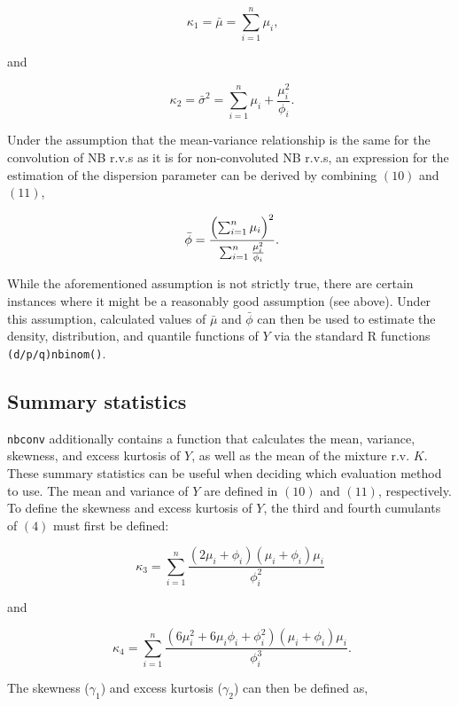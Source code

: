 \documentclass{article}
\begin{document}
\begin{equation}
	\phantom{ , } \kappa_1 =  \bar{ \mu } = \sum_{ i=1 }^n \mu_i ,
\end{equation}

and

\begin{equation}
	\phantom{ . } \kappa_2 = \bar{ \sigma }^2  = \sum_{ i=1 }^n \mu_i + \frac{ \mu_i^2 }{ \phi_i } .
\end{equation}

Under the assumption that the mean-variance relationship is the same for the convolution of NB r.v.s as it is for non-convoluted NB r.v.s, an expression for the estimation of the dispersion parameter can be derived by combining $(10)$ and $(11)$,

\begin{equation}
	\phantom{ . }	\bar{ \phi } = \frac{ \Bigl( \sum_{ i=1 }^n \mu_i \Bigr )^2}{ \sum_{ i=1 }^n \frac{ \mu_i^2 }{ \phi_i } } .
\end{equation}

While the aforementioned assumption is not strictly true, there are certain instances  where it might be a reasonably good assumption (see above). Under this assumption, calculated values of $\bar{ \mu }$ and $\bar{ \phi }$ can then be used to estimate the density, distribution, and quantile functions of $Y$ via the standard R functions \verb|(d/p/q)nbinom()|. 

\subsection{Summary statistics}

\verb|nbconv| additionally contains a function that calculates the mean, variance, skewness, and excess kurtosis of $Y$, as well as the mean of the mixture r.v. $K$. These summary statistics can be useful when deciding which evaluation method to use. The mean and variance of $Y$ are defined in $(10)$ and  $(11)$, respectively. To define the skewness and excess kurtosis of $Y$, the third and fourth cumulants of $(4)$ must first be defined:

$$
\kappa_3 = \sum_{i=1}^n \frac{ ( 2 \mu_i + \phi_i ) ( \mu_i + \phi_i)  \mu_i } {  \phi_i^2 }
$$

and

$$
\phantom{ . } \kappa_4 = \sum_{i=1}^n \frac{ ( 6 \mu_i^2 + 6 \mu_i \phi_i + \phi_i^2) ( \mu_i + \phi_i ) \mu_i } {  \phi_i^3 } .
$$

The skewness ($\gamma_1$) and excess kurtosis ($\gamma_2$) can then be defined as,
\end{document}
